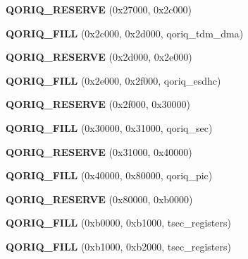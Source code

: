 \begin{DoxyCompactItemize}
{\bfseries Q\+O\+R\+I\+Q\+\_\+\+R\+E\+S\+E\+R\+VE} (0x27000, 0x2c000)
\item 
\mbox{\label{structqoriq__ccsr_a48aac1d8366471145465efbcd78ea7ea}} 
{\bfseries Q\+O\+R\+I\+Q\+\_\+\+F\+I\+LL} (0x2c000, 0x2d000, qoriq\+\_\+tdm\+\_\+dma)
\item 
\mbox{\label{structqoriq__ccsr_a6598a6d8fb8cc41b1b2bc4192346540c}} 
{\bfseries Q\+O\+R\+I\+Q\+\_\+\+R\+E\+S\+E\+R\+VE} (0x2d000, 0x2e000)
\item 
\mbox{\label{structqoriq__ccsr_aaca1f15613d9b9ad8b4eff5f05959138}} 
{\bfseries Q\+O\+R\+I\+Q\+\_\+\+F\+I\+LL} (0x2e000, 0x2f000, qoriq\+\_\+esdhc)
\item 
\mbox{\label{structqoriq__ccsr_a766439d941d40b44844e12b1733fe0f4}} 
{\bfseries Q\+O\+R\+I\+Q\+\_\+\+R\+E\+S\+E\+R\+VE} (0x2f000, 0x30000)
\item 
\mbox{\label{structqoriq__ccsr_a367f7b5af08259d910b4a9cd0476eaa7}} 
{\bfseries Q\+O\+R\+I\+Q\+\_\+\+F\+I\+LL} (0x30000, 0x31000, qoriq\+\_\+sec)
\item 
\mbox{\label{structqoriq__ccsr_a603a18d3d8830dccf455b59637a5bbd4}} 
{\bfseries Q\+O\+R\+I\+Q\+\_\+\+R\+E\+S\+E\+R\+VE} (0x31000, 0x40000)
\item 
\mbox{\label{structqoriq__ccsr_aa32478e94b3940bb1913a5523c866ab0}} 
{\bfseries Q\+O\+R\+I\+Q\+\_\+\+F\+I\+LL} (0x40000, 0x80000, qoriq\+\_\+pic)
\item 
\mbox{\label{structqoriq__ccsr_a643acde275ede6183d8fe5e03e7a680c}} 
{\bfseries Q\+O\+R\+I\+Q\+\_\+\+R\+E\+S\+E\+R\+VE} (0x80000, 0xb0000)
\item 
\mbox{\label{structqoriq__ccsr_a5e3356868ac7730f231174012d6c6e9e}} 
{\bfseries Q\+O\+R\+I\+Q\+\_\+\+F\+I\+LL} (0xb0000, 0xb1000, tsec\+\_\+registers)
\item 
\mbox{\label{structqoriq__ccsr_ac7e2987f153d1062039c00e760d97284}} 
{\bfseries Q\+O\+R\+I\+Q\+\_\+\+F\+I\+LL} (0xb1000, 0xb2000, tsec\+\_\+registers)

\end{DoxyCompactItemize}

